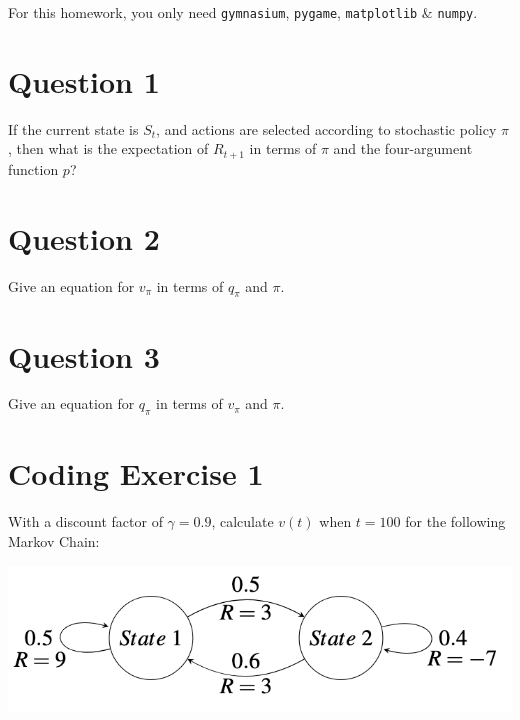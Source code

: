 \documentclass[
  letterpaper,
  DIV=11,
  numbers=noendperiod]{scrreprt}
\begin{document}
\begin{tcolorbox}[enhanced jigsaw, toprule=.15mm, leftrule=.75mm, coltitle=black, left=2mm, opacityback=0, titlerule=0mm, arc=.35mm, toptitle=1mm, opacitybacktitle=0.6, bottomtitle=1mm, colframe=quarto-callout-note-color-frame, title=\textcolor{quarto-callout-note-color}{\faInfo}\hspace{0.5em}{Note}, rightrule=.15mm, bottomrule=.15mm, colbacktitle=quarto-callout-note-color!10!white, breakable, colback=white]

For this homework, you only need \texttt{gymnasium}, \texttt{pygame},
\texttt{matplotlib} \& \texttt{numpy}.

\end{tcolorbox}

\section{Question 1}\label{question-1-1}

If the current state is \(S_{t}\), and actions are selected according to
stochastic policy \(\pi\), then what is the expectation of \(R_{t+1}\)
in terms of \(\pi\) and the four-argument function \(p\)?

\section{Question 2}\label{question-2-1}

Give an equation for \(v_{\pi}\) in terms of \(q_{\pi}\) and \(\pi\).

\section{Question 3}\label{question-3-1}

Give an equation for \(q_{\pi}\) in terms of \(v_{\pi}\) and \(\pi\).

\section{Coding Exercise 1}\label{coding-exercise-1-1}

With a discount factor of \(\gamma = 0.9\), calculate \(v(t)\) when
\(t = 100\) for the following Markov Chain:

\begin{center}
\includegraphics[width=0.4\linewidth,height=\textheight,keepaspectratio]{homework/images/hw4-1.png}
\end{center}
\end{document}
